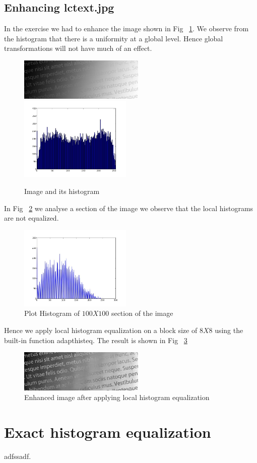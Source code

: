 \documentclass[paper=a4, fontsize=11pt]{scrartcl} %
\numberwithin{equation}{section} %
\numberwithin{figure}{section} %
\numberwithin{table}{section} %
\begin{document}
\subsection{Enhancing lctext.jpg}
    In the exercise we had to enhance the image shown in Fig ~\ref{fig:lctext}. We observe from the histogram that there is a uniformity at a global level. Hence global transformations will not have much of an effect.
        \begin{figure}[h!]
            \centering
            \includegraphics[clip,height=2cm]{lctext}
            \includegraphics[clip,height=4cm]{lctexthist}
            \caption{Image and its histogram}
            \label{fig:lctext}
        \end{figure}
        In Fig ~\ref{fig:lctextlefthist} we analyse a section of the image we observe that the local histograms are not equalized. 
        \begin{figure}[h!]
            \centering
            \includegraphics[clip,height=4cm]{lctextlefthist}
            \caption{Plot Histogram of \(100X100\) section of the image}
            \label{fig:lctextlefthist}
        \end{figure}

        Hence we apply local histogram equalization on a block size of \(8X8\) using the built-in function adapthisteq. The result is shown in Fig ~\ref{fig:lctextenhanced}
        \begin{figure}[h!]
            \centering
            \includegraphics[clip,height=2cm]{lctextenhanced}
            \caption{Enhanced image after applying local histogram equalization}
            \label{fig:lctextenhanced}
        \end{figure}

\section{Exact histogram equalization}
adfssadf.
\end{document}
